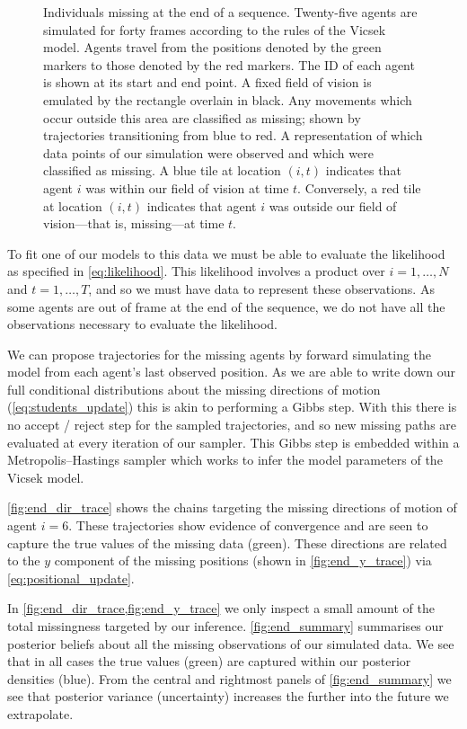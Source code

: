 \begin{figure}[tbp]
  \caption{Individuals missing at the end of a sequence.
   Twenty-five agents are simulated for forty frames
  according to the rules of the Vicsek model. Agents travel from the positions
  denoted by the green markers to those denoted by the red markers. The ID of
  each agent is shown at its start and end point. A fixed field of vision is
  emulated by the rectangle overlain in black. Any movements which occur
  outside this area are classified as missing; shown by trajectories
  transitioning from blue to red.
   A representation of which data points of our
  simulation were observed and which were classified as missing. A blue tile at
  location $(i, t)$ indicates that agent $i$ was within our field of vision at
  time $t$. Conversely, a red tile at location $(i, t)$ indicates that agent
  $i$ was outside our field of vision---that is, missing---at time $t$.}
  \label{fig:end_data}
\end{figure}

To fit one of our models to this data we must be able to evaluate the
likelihood as specified in \cref{eq:likelihood}. This likelihood involves a
product over $i=1,\ldots,N$ and $t=1,\ldots,T$, and so we must have data to
represent these observations. As some agents are out of frame at the end of the
sequence, we do not have all the observations necessary to evaluate the
likelihood.

We can propose trajectories for the missing agents by forward simulating the
model from each agent's last observed position. As we are able to write down
our full conditional distributions about the missing directions of motion
(\cref{eq:students_update}) this is akin to performing a Gibbs step. With
this there is no accept / reject step for the sampled trajectories, and so new
missing paths are evaluated at every iteration of our sampler. This Gibbs step
is embedded within a Metropolis--Hastings sampler which works to infer the
model parameters of the Vicsek model.

\cref{fig:end_dir_trace} shows the chains targeting the missing directions of
motion of agent $i=6$. These trajectories show evidence of convergence and are
seen to capture the true values of the missing data (green). These directions
are related to the $y$ component of the missing positions (shown in
\cref{fig:end_y_trace}) via \cref{eq:positional_update}.

In \cref{fig:end_dir_trace,fig:end_y_trace} we only inspect a small amount of
the total missingness targeted by our inference. \cref{fig:end_summary}
summarises our posterior beliefs about all the missing observations of our
simulated data. We see that in all cases the true values (green) are captured
within our posterior densities (blue). From the central and rightmost panels of
\cref{fig:end_summary} we see that posterior variance (uncertainty) increases
the further into the future we extrapolate.

